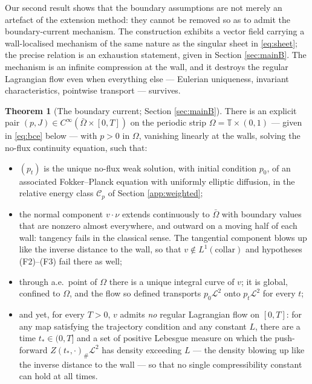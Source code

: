 \documentclass[11pt]{amsart}
\theoremstyle{definition}
\newtheorem{thmx}{Theorem}
\newcommand{\LL}[1]{\mathcal{L}^{#1}}
\newcommand{\T}{\mathbb{T}}
\begin{document}
Our second   result shows that the boundary assumptions are not merely an artefact of the  extension method: they cannot be removed so as to admit the boundary-current mechanism.
The construction
exhibits a vector field carrying a wall-localised mechanism of the same
nature as the singular sheet in \eqref{eq:sheet}; the precise
relation is an exhaustion statement, given in Section
\ref{sec:mainB}. The mechanism is an infinite compression at the
wall, and it destroys the regular Lagrangian flow even when
everything else --- Eulerian uniqueness, invariant characteristics,
pointwise transport --- survives.

\begin{thmx}[The boundary current; Section \ref{sec:mainB}]
\label{thm:B}
There is an explicit pair $(p,J) \in
C^\infty(\bar\Omega\times[0,T])$ on the periodic strip $\Omega =
\T\times(0,1)$ --- given in \eqref{eq:bce} below --- with $p > 0$ in
$\Omega$, vanishing linearly at the walls, solving the no-flux
continuity equation, such that:
\begin{itemize}
\item[(i)] $(p_t)$ is the unique no-flux weak solution, with initial condition
$p_0$, of an associated Fokker--Planck equation with uniformly
elliptic diffusion, in the relative energy class $\mathcal{C}_p$ of
Section  \ref{app:weighted};
\item[(ii)] the normal component $v\cdot\nu$ extends continuously to
$\bar\Omega$ with boundary values that are nonzero almost
everywhere, and outward on a moving half of each wall: tangency
fails in the classical sense. The tangential component blows up like
the inverse distance to the wall, so that $v\notin
L^1(\text{collar})$ and hypotheses \textup{(F2)--(F3)} fail there as
well;
\item[(iii)] through a.e.\ point of $\Omega$ there is a unique
integral curve of $v$; it is global, confined to $\Omega$, and the
flow so defined transports $p_0\LL{2}$ onto $p_t\LL{2}$ for every
$t$;
\item[(iv)] and yet, for every $T > 0$, $v$ admits \emph{no} regular
Lagrangian flow on $[0,T]$: for any map satisfying the trajectory
condition and any constant $L$, there are a time $t_*\in(0,T]$ and a
set of positive Lebesgue measure on which the push-forward
$Z(t_*,\cdot)_\#\LL{2}$ has density exceeding $L$ --- the density
blowing up like the inverse distance to the wall --- so that no
single compressibility constant can hold at all times.
\end{itemize}
\end{thmx}
\end{document}
